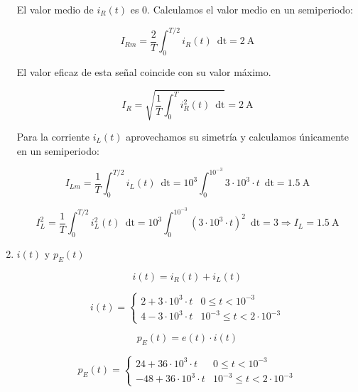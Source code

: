 \documentclass[10pt]{article}
\begin{document}
\begin{enumerate}
  El valor medio de $i_R(t)$ es 0. Calculamos el valor medio en un semiperiodo:

  \[
    I_{Rm} = \frac{2}{T} \int_0^{T/2} i_R(t) \enspace \mathrm{dt} = \SI{2}{\ampere} 
  \]

  El valor eficaz de esta señal coincide con su valor máximo.

  \[
    I_R = \sqrt{\frac{1}{T} \int_0^T i^2_R(t) \enspace \mathrm{dt}} = \SI{2}{\ampere} 
  \]

  Para la corriente $i_L(t)$ aprovechamos su simetría y calculamos únicamente en un semiperiodo:

    \[
      I_{Lm} = \frac{1}{T} \int_0^{T/2} i_L(t) \enspace \mathrm{dt} = 10^3 \int_0^{10^{-3}} 3 \cdot 10 ^3 \cdot t \enspace \mathrm{dt} = \SI{1.5}{\ampere} 
  \]

      \[
      I^2_L = \frac{1}{T} \int_0^{T/2} i^2_L(t) \enspace \mathrm{dt} = 10^3 \int_0^{10^{-3}} (3 \cdot 10 ^3 \cdot t)^2 \enspace \mathrm{dt} = 3 \Rightarrow I_L = \SI{1.5}{\ampere} 
  \]

  
\item $i(t)$ y $p_E(t)$

  \[
    i(t) = i_R(t) + i_L(t)
  \]

  \[
    i(t) = %
    \begin{cases}
      2 + 3\cdot 10^3 \cdot t &  0 \leq t < 10^{-3}\\ 
      4 - 3\cdot 10^3 \cdot t & 10^{-3} \leq t < 2 \cdot 10^{-3}
    \end{cases}
  \]

  \[
    p_E(t) = e(t) \cdot i(t)
  \]
  
  \[
    p_E(t) = %
    \begin{cases}
      24 + 36\cdot 10^3 \cdot t &  0 \leq t < 10^{-3}\\ 
      -48 + 36\cdot 10^3 \cdot t & 10^{-3} \leq t < 2 \cdot 10^{-3}
    \end{cases}
  \]

\end{enumerate}
\end{document}
